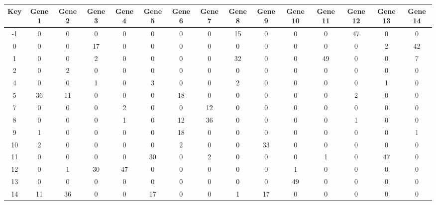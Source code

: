 \begin{tabular}{|c|c|c|c|c|c|c|c|c|c|c|c|c|c|c|}
\hline
Key & Gene 1 & Gene 2 & Gene 3 & Gene 4 & Gene 5 & Gene 6 & Gene 7 & Gene 8 & Gene 9 & Gene 10 & Gene 11 & Gene 12 & Gene 13 & Gene 14 \\
\hline
-1 & 0 & 0 & 0 & 0 & 0 & 0 & 0 & 15 & 0 & 0 & 0 & 47 & 0 & 0 \\
0 & 0 & 0 & 17 & 0 & 0 & 0 & 0 & 0 & 0 & 0 & 0 & 0 & 2 & 42 \\
1 & 0 & 0 & 2 & 0 & 0 & 0 & 0 & 32 & 0 & 0 & 49 & 0 & 0 & 7 \\
2 & 0 & 2 & 0 & 0 & 0 & 0 & 0 & 0 & 0 & 0 & 0 & 0 & 0 & 0 \\
4 & 0 & 0 & 1 & 0 & 3 & 0 & 0 & 2 & 0 & 0 & 0 & 0 & 1 & 0 \\
5 & 36 & 11 & 0 & 0 & 0 & 18 & 0 & 0 & 0 & 0 & 0 & 2 & 0 & 0 \\
7 & 0 & 0 & 0 & 2 & 0 & 0 & 12 & 0 & 0 & 0 & 0 & 0 & 0 & 0 \\
8 & 0 & 0 & 0 & 1 & 0 & 12 & 36 & 0 & 0 & 0 & 0 & 1 & 0 & 0 \\
9 & 1 & 0 & 0 & 0 & 0 & 18 & 0 & 0 & 0 & 0 & 0 & 0 & 0 & 1 \\
10 & 2 & 0 & 0 & 0 & 0 & 2 & 0 & 0 & 33 & 0 & 0 & 0 & 0 & 0 \\
11 & 0 & 0 & 0 & 0 & 30 & 0 & 2 & 0 & 0 & 0 & 1 & 0 & 47 & 0 \\
12 & 0 & 1 & 30 & 47 & 0 & 0 & 0 & 0 & 0 & 1 & 0 & 0 & 0 & 0 \\
13 & 0 & 0 & 0 & 0 & 0 & 0 & 0 & 0 & 0 & 49 & 0 & 0 & 0 & 0 \\
14 & 11 & 36 & 0 & 0 & 17 & 0 & 0 & 1 & 17 & 0 & 0 & 0 & 0 & 0 \\
\hline
\end{tabular}